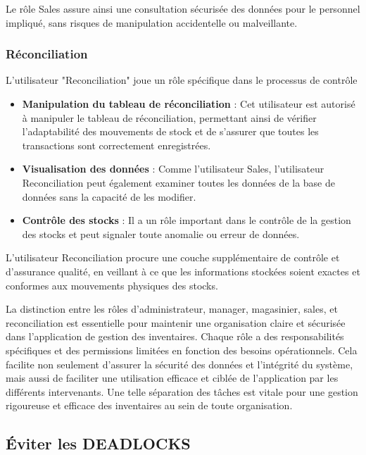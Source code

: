 \documentclass[a4paper, oneside, 12pt, final]{extreport}
\begin{document}
Le rôle Sales assure ainsi une consultation sécurisée des données pour le personnel impliqué, sans risques de manipulation accidentelle ou malveillante.

\subsubsection{Réconciliation}

L'utilisateur "Reconciliation" joue un rôle spécifique dans le processus de contrôle 
\begin{itemize}
    \item \textbf{Manipulation du tableau de réconciliation} : Cet utilisateur est autorisé à manipuler le tableau de réconciliation, permettant ainsi de vérifier l’adaptabilité des mouvements de stock et de s'assurer que toutes les transactions sont correctement enregistrées.
    \item \textbf{Visualisation des données} : Comme l'utilisateur Sales, l'utilisateur Reconciliation peut également examiner toutes les données de la base de données sans la capacité de les modifier.
    \item \textbf{Contrôle des stocks} : Il a un rôle important dans le contrôle de la gestion des stocks et peut signaler toute anomalie ou erreur de données.
\end{itemize}

L'utilisateur Reconciliation procure une couche supplémentaire de contrôle et d'assurance qualité, en veillant à ce que les informations stockées soient exactes et conformes aux mouvements physiques des stocks.



La distinction entre les rôles d'administrateur, manager, magasinier, sales, et reconciliation est essentielle pour maintenir une organisation claire et sécurisée dans l'application de gestion des inventaires. Chaque rôle a des responsabilités spécifiques et des permissions limitées en fonction des besoins opérationnels. Cela facilite non seulement d'assurer la sécurité des données et l'intégrité du système, mais aussi de faciliter une utilisation efficace et ciblée de l'application par les différents intervenants. Une telle séparation des tâches est vitale pour une gestion rigoureuse et efficace des inventaires au sein de toute organisation.

\subsection{Éviter les DEADLOCKS}
\end{document}
